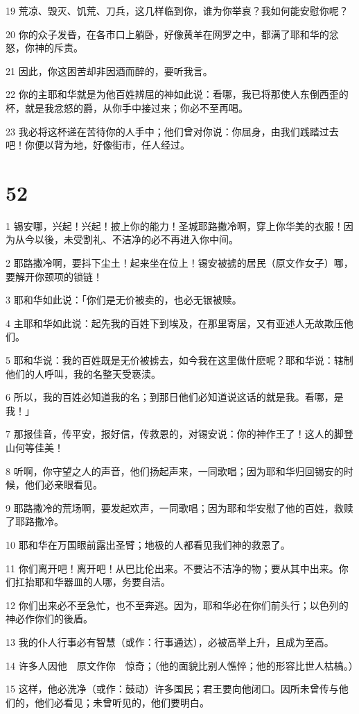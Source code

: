 \par 19 荒凉、毁灭、饥荒、刀兵，这几样临到你，谁为你举哀？我如何能安慰你呢？
\par 20 你的众子发昏，在各市口上躺卧，好像黄羊在网罗之中，都满了耶和华的忿怒，你神的斥责。
\par 21 因此，你这困苦却非因酒而醉的，要听我言。
\par 22 你的主耶和华就是为他百姓辨屈的神如此说：看哪，我已将那使人东倒西歪的杯，就是我忿怒的爵，从你手中接过来；你必不至再喝。
\par 23 我必将这杯递在苦待你的人手中；他们曾对你说：你屈身，由我们践踏过去吧！你便以背为地，好像街市，任人经过。

\chapter{52}

\par 1 锡安哪，兴起！兴起！披上你的能力！圣城耶路撒冷啊，穿上你华美的衣服！因为从今以後，未受割礼、不洁净的必不再进入你中间。
\par 2 耶路撒冷啊，要抖下尘土！起来坐在位上！锡安被掳的居民（原文作女子）哪，要解开你颈项的锁链！
\par 3 耶和华如此说：「你们是无价被卖的，也必无银被赎。
\par 4 主耶和华如此说：起先我的百姓下到埃及，在那里寄居，又有亚述人无故欺压他们。
\par 5 耶和华说：我的百姓既是无价被掳去，如今我在这里做什麽呢？耶和华说：辖制他们的人呼叫，我的名整天受亵渎。
\par 6 所以，我的百姓必知道我的名；到那日他们必知道说这话的就是我。看哪，是我！」
\par 7 那报佳音，传平安，报好信，传救恩的，对锡安说：你的神作王了！这人的脚登山何等佳美！
\par 8 听啊，你守望之人的声音，他们扬起声来，一同歌唱；因为耶和华归回锡安的时候，他们必亲眼看见。
\par 9 耶路撒冷的荒场啊，要发起欢声，一同歌唱；因为耶和华安慰了他的百姓，救赎了耶路撒冷。
\par 10 耶和华在万国眼前露出圣臂；地极的人都看见我们神的救恩了。
\par 11 你们离开吧！离开吧！从巴比伦出来。不要沾不洁净的物；要从其中出来。你们扛抬耶和华器皿的人哪，务要自洁。
\par 12 你们出来必不至急忙，也不至奔逃。因为，耶和华必在你们前头行；以色列的神必作你们的後盾。
\par 13 我的仆人行事必有智慧（或作：行事通达），必被高举上升，且成为至高。
\par 14 许多人因他　原文作你　惊奇；（他的面貌比别人憔悴；他的形容比世人枯槁。）
\par 15 这样，他必洗净（或作：鼓动）许多国民；君王要向他闭口。因所未曾传与他们的，他们必看见；未曾听见的，他们要明白。


